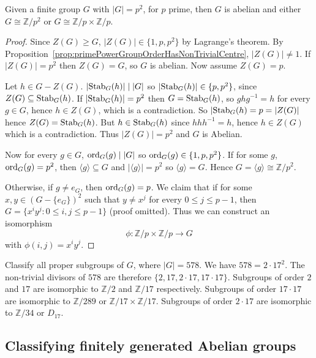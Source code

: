 \begin{theorem}
	Given a finite group $G$ with $|G| = p^2$, for $p$ prime, then $G$ is abelian and either $G \cong \mathbb{Z} / p^2$ or $G \cong \mathbb{Z} / p \times \mathbb{Z} / p$.
\end{theorem}

\begin{proof}
	Since $Z(G) \ge G$, $|Z(G)| \in \{ 1, p, p^2 \}$ by Lagrange's theorem. By Proposition~\ref{prop:primePowerGroupOrderHasNonTrivialCentre}, $|Z(G)| \ne 1$. If $|Z(G)| = p^2$ then $Z(G) = G$, so $G$ is abelian. Now assume $Z(G) = p$.

	Let $h \in G - Z(G)$. $|\text{Stab}_G(h)| \mid |G|$ so $|\text{Stab}_G(h)| \in \{ p, p^2 \}$, since $Z(G) \subseteq \text{Stab}_G(h)$. If $|\text{Stab}_G(h)| = p^2$ then $G = \text{Stab}_G(h)$, so $ghg^{-1} = h$ for every $g \in G$, hence $h \in Z(G)$, which is a contradiction. So $|\text{Stab}_G(h) = p = |Z(G)|$ hence $Z(G) = \text{Stab}_G(h)$. But $h \in \text{Stab}_G(h)$ since $hhh^{-1} = h$, hence $h \in Z(G)$ which is a contradiction. Thus $|Z(G)| = p^2$ and $G$ is Abelian.

	Now for every $g \in G$, $\text{ord}_G(g) \mid |G|$ so $\text{ord}_G(g) \in \{ 1, p, p^2 \}$. If for some $g$, $\text{ord}_G(g) = p^2$, then $\langle g \rangle \subseteq G$ and $|\langle g \rangle| = p^2$ so $\langle g \rangle = G$. Hence $G = \langle g \rangle \cong \mathbb{Z} / p^2$.

	Otherwise, if $g \ne e_G$, then $\text{ord}_G(g) = p$. We claim that if for some $x, y \in {(G - \{ e_G \})}^2$ such that $y \ne x^j$ for every $0 \le j \le p - 1$, then $G = \{ x^i y^j: 0 \le i, j \le p - 1 \}$ (proof omitted). Thus we can construct an isomorphism
	\[
		\phi: \mathbb{Z} / p \times \mathbb{Z} / p \to G
	\]
	with $\phi(i, j) = x^i y^j$.
\end{proof}

\begin{example}
	Classify all proper subgroups of $G$, where $|G| = 578$. We have $578 = 2 \cdot 17^2$. The non-trivial divisors of $578$ are therefore $\{ 2, 17, 2 \cdot 17, 17 \cdot 17 \}$. Subgroups of order $2$ and $17$ are isomorphic to $\mathbb{Z} / 2$ and $\mathbb{Z} / 17$ respectively. Subgroups of order $17 \cdot 17$ are isomorphic to $\mathbb{Z} / 289$ or $\mathbb{Z} / 17 \times \mathbb{Z} / 17$. Subgroups of order $2 \cdot 17$ are isomorphic to $\mathbb{Z} / 34$ or $D_{17}$.
\end{example}

\subsection{Classifying finitely generated Abelian groups}

